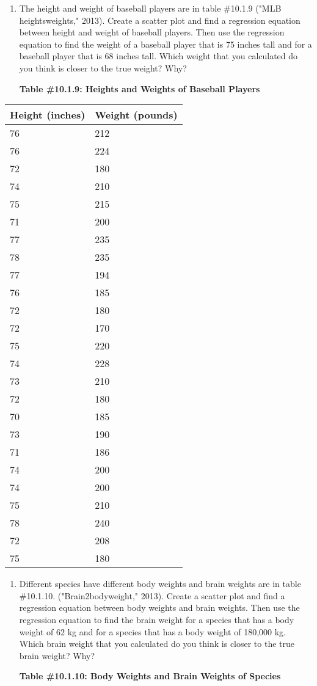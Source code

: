 \documentclass[]{book}
\begin{document}
\begin{enumerate}
\def\labelenumi{\arabic{enumi}.}
\setcounter{enumi}{4}
\item
  The height and weight of baseball players are in table \#10.1.9
  ("MLB heightsweights," 2013). Create a scatter plot and find a
  regression equation between height and weight of baseball players.
  Then use the regression equation to find the weight of a baseball
  player that is 75 inches tall and for a baseball player that is 68
  inches tall. Which weight that you calculated do you think is closer
  to the true weight? Why?

  \textbf{Table \#10.1.9: Heights and Weights of Baseball Players}
\end{enumerate}

\begin{longtable}[]{@{}ll@{}}
\toprule
Height (inches) & Weight (pounds)\tabularnewline
\midrule
\endhead
76 & 212\tabularnewline
76 & 224\tabularnewline
72 & 180\tabularnewline
74 & 210\tabularnewline
75 & 215\tabularnewline
71 & 200\tabularnewline
77 & 235\tabularnewline
78 & 235\tabularnewline
77 & 194\tabularnewline
76 & 185\tabularnewline
72 & 180\tabularnewline
72 & 170\tabularnewline
75 & 220\tabularnewline
74 & 228\tabularnewline
73 & 210\tabularnewline
72 & 180\tabularnewline
70 & 185\tabularnewline
73 & 190\tabularnewline
71 & 186\tabularnewline
74 & 200\tabularnewline
74 & 200\tabularnewline
75 & 210\tabularnewline
78 & 240\tabularnewline
72 & 208\tabularnewline
75 & 180\tabularnewline
\bottomrule
\end{longtable}

\begin{enumerate}
\def\labelenumi{\arabic{enumi}.}
\setcounter{enumi}{5}
\item
  Different species have different body weights and brain weights are
  in table \#10.1.10. ("Brain2bodyweight," 2013). Create a scatter
  plot and find a regression equation between body weights and brain
  weights. Then use the regression equation to find the brain weight
  for a species that has a body weight of 62 kg and for a species that
  has a body weight of 180,000 kg. Which brain weight that you
  calculated do you think is closer to the true brain weight? Why?

  \textbf{Table \#10.1.10: Body Weights and Brain Weights of Species}
\end{enumerate}
\end{document}

